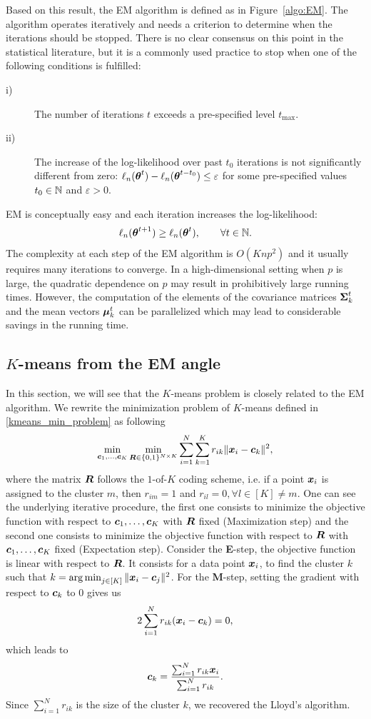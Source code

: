 Based on this result, the EM algorithm is defined as in Figure~\ref{algo:EM}.
The algorithm operates iteratively and needs a criterion to determine when
the iterations should be stopped. There is no clear consensus on this point in the
statistical literature, but it is a commonly used  practice to stop when one of the
following conditions is fulfilled:
\begin{description}
\item[i)]  The number of iterations $t$ exceeds a pre-specified level $t_{\max}$.
\item[ii)] The increase of the log-likelihood over past $t_0$ iterations is not
significantly different from zero: $\ell_n({\boldsymbol\theta}^{t})-\ell_n({\boldsymbol\theta}^{t-t_0})\le \varepsilon$
for some pre-specified values $t_0\in{\mathbb N}$ and $\varepsilon>0$.
\end{description}
EM is conceptually easy and each iteration increases the log-likelihood:
$$
\ell_n({\boldsymbol\theta}^{t+1})\ge \ell_n({\boldsymbol\theta}^{t}),\qquad \forall t\in{\mathbb N}.
$$
The complexity at each step of the EM algorithm is $O(Knp^2)$ and
it usually requires many iterations to converge. In a high-dimensional setting
when $p$ is large, the quadratic dependence on $p$ may result in prohibitively
large running times. However, the computation of the elements of the covariance
matrices $\boldsymbol\Sigma^t_k$ and the mean vectors $\boldsymbol\mu^t_k$ can be parallelized which
may lead to considerable savings in the running time.
\subsection{$K$-means from the EM angle}

In this section, we will see that the $K$-means problem is closely related to the EM algorithm. We rewrite the minimization problem of $K$-means defined in \cref{kmeans_min_problem} as following
\begin{equation}
  \min_{\boldsymbol c_1,\dots,\boldsymbol c_K}\min_{\boldsymbol R \in \{0,1\}^{N\times K}}\sum_{i=1}^N\sum_{k=1}^K r_{ik}\|\boldsymbol x_i - \boldsymbol c_k \|^2,
\end{equation}
where the matrix $\boldsymbol R$ follows the $1$-of-$K$ coding scheme, i.e. if a point $\boldsymbol x_i$ is assigned to the cluster $m$, then $r_{im}=1$ and $r_{il}=0, \forall l\in [K] \neq m$. One can see the underlying iterative procedure, the first one consists to minimize the objective function with respect to $\boldsymbol c_1,\dots,\boldsymbol c_K$ with $\boldsymbol R$ fixed (Maximization step) and the second one consists to minimize the objective function with respect to $\boldsymbol R$ with $\boldsymbol c_1,\dots,\boldsymbol c_K$ fixed (Expectation step). Consider the \textbf{E}-step, the objective function is linear with respect to $\boldsymbol R$.  It consists for a data point $\boldsymbol x_i$, to find the cluster $k$ such that $k = \operatorname*{arg\,min}_{j\in[K]}\|\boldsymbol x_i-\boldsymbol c_j\|^2$. For the \textbf{M}-step, setting the gradient with respect to $\boldsymbol c_k$ to 0 gives us
\begin{equation}
  2\sum_{i=1}^N r_{ik} (\boldsymbol x_i-\boldsymbol c_k) = 0,
\end{equation}
which leads to
\begin{equation}
  \boldsymbol c_k = \frac{\sum_{i=1}^N r_{ik}\boldsymbol x_i}{\sum_{i=1}^N r_{ik}}.
\end{equation}
Since $\sum_{i=1}^Nr_{ik}$ is the size of the cluster $k$, we recovered the Lloyd's algorithm.
